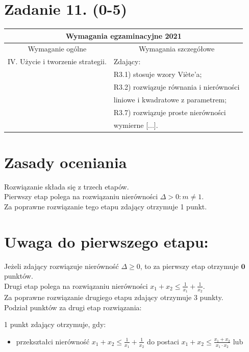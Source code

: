 \documentclass[10pt]{article}
\begin{document}
\section*{Zadanie 11. (0-5)}
\begin{center}
\begin{tabular}{|l|l|}
\hline
\multicolumn{2}{|c|}{Wymagania egzaminacyjne 2021} \\
\hline
\multicolumn{1}{|c|}{Wymaganie ogólne} & \multicolumn{1}{c|}{Wymagania szczegółowe} \\
\hline
IV. Użycie i tworzenie strategii. & Zdający: \\
 & R3.1) stosuje wzory Viète'a; \\
 & R3.2) rozwiązuje równania i nierówności \\
 & liniowe i kwadratowe z parametrem; \\
 & R3.7) rozwiązuje proste nierówności \\
 & wymierne [...]. \\
\hline
\end{tabular}
\end{center}

\section*{Zasady oceniania}
Rozwiązanie składa się z trzech etapów.\\
Pierwszy etap polega na rozwiązaniu nierówności $\Delta>0: m \neq 1$.\\
Za poprawne rozwiązanie tego etapu zdający otrzymuje 1 punkt.

\section*{Uwaga do pierwszego etapu:}
Jeżeli zdający rozwiązuje nierówność $\Delta \geq 0$, to za pierwszy etap otrzymuje $\mathbf{0}$ punktów.\\
Drugi etap polega na rozwiązaniu nierówności $x_{1}+x_{2} \leq \frac{1}{x_{1}}+\frac{1}{x_{2}}$.\\
Za poprawne rozwiązanie drugiego etapu zdający otrzymuje 3 punkty.\\
Podział punktów za drugi etap rozwiązania:

1 punkt zdający otrzymuje, gdy:

\begin{itemize}
  \item przekształci nierówność $x_{1}+x_{2} \leq \frac{1}{x_{1}}+\frac{1}{x_{2}}$ do postaci $x_{1}+x_{2} \leq \frac{x_{1}+x_{2}}{x_{1} \cdot x_{2}}$ lub
\end{itemize}
\end{document}
